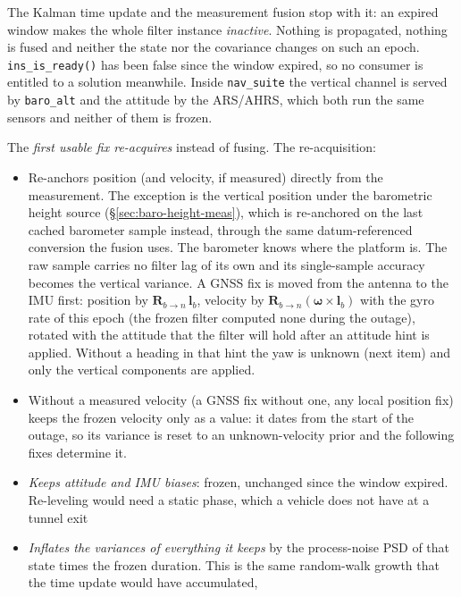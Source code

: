 \documentclass[11pt,a4paper]{article}
\newcommand{\code}[1]{\texttt{#1}}
\begin{document}
The Kalman time update and the measurement fusion stop with it: an expired
window makes the whole filter instance \emph{inactive}. Nothing is propagated,
nothing is fused and neither the state nor the covariance changes on such an
epoch. \code{ins\_\allowbreak{}is\_\allowbreak{}ready()} has been false since the window expired, so no
consumer is entitled to a solution meanwhile. Inside \code{nav\_\allowbreak{}suite} the
vertical channel is served by \code{baro\_\allowbreak{}alt} and the attitude by the ARS/AHRS,
which both run the same sensors and neither of them is frozen.

The \emph{first usable fix re-acquires} instead of fusing. The re-acquisition:
\begin{itemize}
  \item Re-anchors position (and velocity, if measured) directly from
        the measurement. The exception is the vertical position under the
        barometric height source (\S\ref{sec:baro-height-meas}), which
        is re-anchored on the last cached barometer sample instead,
        through the same datum-referenced conversion the fusion uses.
        The barometer knows where the platform is. The raw sample
        carries no filter lag of its own and its single-sample accuracy
        becomes the vertical variance. A GNSS fix is moved from the antenna
        to the IMU first: position by $\mathbf{R}_{b\to n}\,\mathbf{l}_b$,
        velocity by $\mathbf{R}_{b\to n}(\boldsymbol{\omega}\times\mathbf{l}_b)$
        with the gyro rate of this epoch (the frozen filter computed none during
        the outage), rotated with the attitude that the filter will hold after an
        attitude hint is applied. Without a heading in that hint the yaw is
        unknown (next item) and only the vertical components are applied.
  \item Without a measured velocity (a GNSS fix without one, any local
        position fix) keeps the frozen velocity only as a value: it dates
        from the start of the outage, so its variance is reset to an
        unknown-velocity prior and the following fixes determine it.
  \item \emph{Keeps attitude and IMU biases}: frozen, unchanged since
        the window expired. Re-leveling would need a static phase, which a
        vehicle does not have at a tunnel exit
  \item \emph{Inflates the variances of everything it keeps} by the
        process-noise PSD of that state times the frozen duration. This is the
        same random-walk growth that the time update would have accumulated,

\end{itemize}
\end{document}
